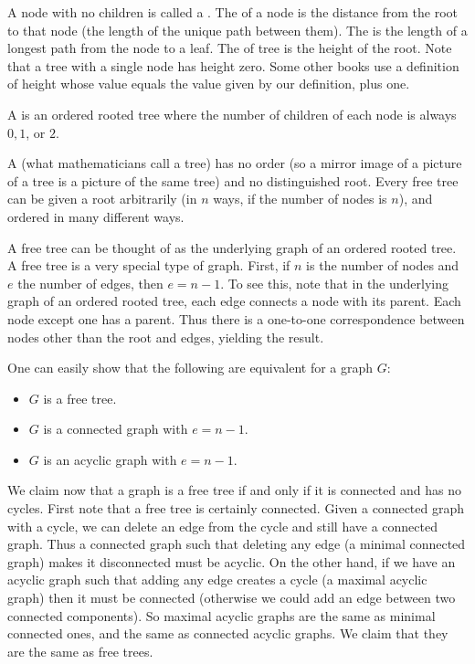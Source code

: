 A node with no children is called a . The  of a node
is the distance from the root  to that node (the length of the unique path between 
them). The  is the length of a longest path from the 
node to a leaf. The  of tree is the height of the root. Note that
a tree with a single node has height zero. Some other books use a definition of 
height whose value equals the value given by our definition, plus one.

A  is an ordered rooted tree where the number 
of children of each node is always $0, 1$, or $2$. 

A  (what mathematicians call a tree) has no order 
(so a mirror image of a picture of a tree is a picture of the same tree) 
and no distinguished root. Every free tree can be given a root arbitrarily 
(in $n$ ways, if the number of nodes is $n$), and ordered in many 
different ways. 

A free tree can be thought of as the underlying graph of an 
ordered rooted tree. A free tree is a very special type of graph. First, if $n$ is the number
of nodes and $e$ the number of edges, then $e=n-1$. To see this, note that
in the underlying graph of an ordered rooted tree, each edge connects
a node with its parent. Each node except one has a parent. Thus there
is a one-to-one correspondence between nodes other than the root 
and edges, yielding the result.

One can easily show that the following are equivalent for a graph $G$:
\begin{itemize}
\item $G$ is a free tree.
\item $G$ is a connected graph with $e=n-1$.
\item $G$ is an acyclic graph with $e=n-1$.
\end{itemize}
\else
We claim now that a graph is a free tree if and only if it is connected
and has no cycles. First note that a free tree is certainly connected.
Given a connected graph with a cycle, we can delete an edge from the
cycle and still have a connected graph. Thus a connected graph such that
deleting any edge (a minimal connected graph) makes it disconnected
must be acyclic. On the other hand, if we have an acyclic graph such
that adding any edge creates a cycle (a maximal acyclic graph) then it
must be connected (otherwise we could add an edge between two connected
components). So maximal acyclic graphs are the same as minimal connected
ones, and the same as connected acyclic graphs. We claim that they are
the same as free trees.

